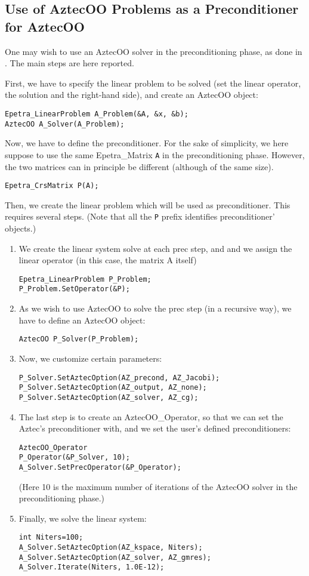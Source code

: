 
\subsection{Use of AztecOO Problems as a Preconditioner for AztecOO}
\label{sec:prec_aztecoo}

One may wish to use an AztecOO solver in the preconditioning phase, as
done in .  The main steps are here reported.

First, we have to specify the linear problem to be solved (set the
linear operator, the solution and the right-hand side), and create an
AztecOO object:
\begin{verbatim}
Epetra_LinearProblem A_Problem(&A, &x, &b);
AztecOO A_Solver(A_Problem);
\end{verbatim}
Now, we have to define the preconditioner. For the sake of simplicity,
we here suppose to use the same Epetra\_Matrix \verb!A! in the
preconditioning phase. However, the two matrices can in principle be
different (although of the same size).
\begin{verbatim}
Epetra_CrsMatrix P(A);
\end{verbatim}
Then, we create the linear problem which will be used as preconditioner.
This requires several steps.  (Note that all the \verb!P! prefix identifies
preconditioner' objects.)
\begin{enumerate}
\item We create the linear system solve at each prec step, and and we
  assign the linear operator (in this case, the matrix A itself)
\begin{verbatim}
Epetra_LinearProblem P_Problem;
P_Problem.SetOperator(&P);
\end{verbatim}
\item As we wish to use AztecOO to solve the prec step (in a recursive
  way), we have to define an AztecOO object:
\begin{verbatim}
AztecOO P_Solver(P_Problem);  
\end{verbatim}
\item Now, we customize certain parameters:
\begin{verbatim}
P_Solver.SetAztecOption(AZ_precond, AZ_Jacobi);
P_Solver.SetAztecOption(AZ_output, AZ_none);
P_Solver.SetAztecOption(AZ_solver, AZ_cg);
\end{verbatim}
\item The last step is to create an AztecOO\_Operator, so that we can set
  the Aztec's preconditioner with, and we set the user's defined
  preconditioners:
\begin{verbatim}
AztecOO_Operator
P_Operator(&P_Solver, 10);  
A_Solver.SetPrecOperator(&P_Operator);
\end{verbatim}
(Here 10 is the maximum number of iterations of the AztecOO solver in
the preconditioning phase.)
\item Finally, we solve the linear system:
\begin{verbatim}
int Niters=100;
A_Solver.SetAztecOption(AZ_kspace, Niters);
A_Solver.SetAztecOption(AZ_solver, AZ_gmres);
A_Solver.Iterate(Niters, 1.0E-12);  
\end{verbatim}
\end{enumerate}

